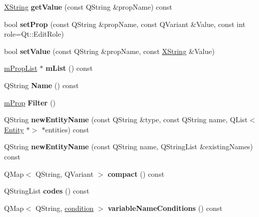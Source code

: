 \begin{DoxyCompactItemize}
\hyperlink{class_x_string}{X\+String} {\bfseries get\+Value} (const Q\+String \&prop\+Name) const
\item 
\mbox{\label{class_entity_aabcde9bb888a240ac2ea33fada642987}} 
bool {\bfseries set\+Prop} (const Q\+String \&prop\+Name, const Q\+Variant \&Value, const int role=Qt\+::\+Edit\+Role)
\item 
\mbox{\label{class_entity_a681ae489c7c11247a5d134c4fbdedc9c}} 
bool {\bfseries set\+Value} (const Q\+String \&prop\+Name, const \hyperlink{class_x_string}{X\+String} \&Value)
\item 
\mbox{\label{class_entity_aace7aa16382739da66ccef00878bb08d}} 
\hyperlink{classm_prop_list}{m\+Prop\+List} $\ast$ {\bfseries m\+List} () const
\item 
\mbox{\label{class_entity_af8ae3495520aa4872c232591e367d47a}} 
Q\+String {\bfseries Name} () const
\item 
\mbox{\label{class_entity_ab9b2c4b49025fa0bf0abf2677bd16955}} 
\hyperlink{classm_prop}{m\+Prop} {\bfseries Filter} ()
\item 
\mbox{\label{class_entity_a175003824f173b42340c5b10bf6d1716}} 
Q\+String {\bfseries new\+Entity\+Name} (const Q\+String \&type, const Q\+String name, Q\+List$<$ \hyperlink{class_entity}{Entity} $\ast$$>$ $\ast$entities) const
\item 
\mbox{\label{class_entity_a6098bd93e68000819f4b824dee41e281}} 
Q\+String {\bfseries new\+Entity\+Name} (const Q\+String name, Q\+String\+List \&existing\+Names) const
\item 
\mbox{\label{class_entity_a47d9e30caccbbbe8da535a1a7626779c}} 
Q\+Map$<$ Q\+String, Q\+Variant $>$ {\bfseries compact} () const
\item 
\mbox{\label{class_entity_a8c2e1f6e786014f54a5701df8993e7c1}} 
Q\+String\+List {\bfseries codes} () const
\item 
\mbox{\label{class_entity_a75009919b96e2c7e954b8a90b03d06df}} 
Q\+Map$<$ Q\+String, \hyperlink{structcondition}{condition} $>$ {\bfseries variable\+Name\+Conditions} () const
$$
\end{DoxyCompactItemize}
